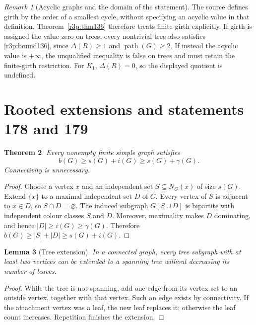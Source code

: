 \documentclass[11pt,a4paper]{article}
\newtheorem{theorem}{Theorem}[section]
\newtheorem{lemma}[theorem]{Lemma}
\theoremstyle{remark}
\newtheorem{remark}[theorem]{Remark}
\begin{document}
\begin{remark}[Acyclic graphs and the domain of the statement]
\label{r3p:scope}
The source defines girth by the order of a smallest cycle, without
specifying an acyclic value in that definition. Theorem~\ref{r3p:thm136}
therefore treats finite girth explicitly. If girth is assigned the value
zero on trees, every nontrivial tree also satisfies
\eqref{r3p:bound136}, since $\Delta(R)\geq1$ and
$\operatorname{path}(G)\geq2$. If instead the acyclic value is $+\infty$,
the unqualified inequality is false on trees and must retain the
finite-girth restriction. For $K_1$, $\Delta(R)=0$, so the displayed
quotient is undefined.
\end{remark}

\section{Rooted extensions and statements 178 and 179}\label{sec:extensions}

\begin{theorem}\label{thm:core}
Every nonempty finite simple graph satisfies
\begin{equation}\label{eq:core}
\boxed{b(G)\ge s(G)+i(G)\ge s(G)+\gamma(G).}
\end{equation}
Connectivity is unnecessary.
\end{theorem}
\begin{proof}
Choose a vertex $x$ and an independent set $S\subseteq N_G(x)$ of size
$s(G)$. Extend $\{x\}$ to a maximal independent set $D$ of $G$.
Every vertex of $S$ is adjacent to $x\in D$, so $S\cap D=\varnothing$.
The induced subgraph $G[S\cup D]$ is bipartite with independent colour
classes $S$ and $D$. Moreover, maximality makes $D$ dominating, and hence
$|D|\ge i(G)\ge\gamma(G)$. Therefore
$b(G)\ge |S|+|D|\ge s(G)+i(G)$.
\end{proof}

\begin{lemma}[Tree extension]\label{lem:extend}
In a connected graph, every tree subgraph with at least two vertices can
be extended to a spanning tree without decreasing its number of leaves.
\end{lemma}
\begin{proof}
While the tree is not spanning, add one edge from its vertex set to an
outside vertex, together with that vertex. Such an edge exists by
connectivity. If the attachment vertex was a leaf, the new leaf replaces
it; otherwise the leaf count increases. Repetition finishes the extension.
\end{proof}
\end{document}
